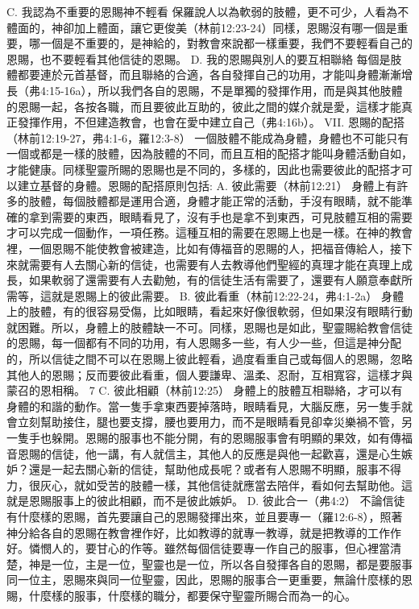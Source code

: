 C. 我認為不重要的恩賜神不輕看
保羅說人以為軟弱的肢體，更不可少，人看為不體面的，神卻加上體面，讓它更俊美（林前12:23-24）同樣，恩賜沒有哪一個是重要，哪一個是不重要的，是神給的，對教會來說都一樣重要，我們不要輕看自己的恩賜，也不要輕看其他信徒的恩賜。
D. 我的恩賜與別人的要互相聯絡
每個是肢體都要連於元首基督，而且聯絡的合適，各自發揮自己的功用，才能叫身體漸漸增長（弗4:15-16a），所以我們各自的恩賜，不是單獨的發揮作用，而是與其他肢體的恩賜一起，各按各職，而且要彼此互助的，彼此之間的媒介就是愛，這樣才能真正發揮作用，不但建造教會，也會在愛中建立自己（弗4:16b）。
VII. 恩賜的配搭（林前12:19-27，弗4:1-6，羅12:3-8）
一個肢體不能成為身體，身體也不可能只有一個或都是一樣的肢體，因為肢體的不同，而且互相的配搭才能叫身體活動自如，才能健康。同樣聖靈所賜的恩賜也是不同的，多樣的，因此也需要彼此的配搭才可以建立基督的身體。恩賜的配搭原則包括:
A. 彼此需要（林前12:21）
身體上有許多的肢體，每個肢體都是運用合適，身體才能正常的活動，手沒有眼睛，就不能準確的拿到需要的東西，眼睛看見了，沒有手也是拿不到東西，可見肢體互相的需要才可以完成一個動作，一項任務。這種互相的需要在恩賜上也是一樣。在神的教會裡，一個恩賜不能使教會被建造，比如有傳福音的恩賜的人，把福音傳給人，接下來就需要有人去關心新的信徒，也需要有人去教導他們聖經的真理才能在真理上成長，如果軟弱了還需要有人去勸勉，有的信徒生活有需要了，還要有人願意奉獻所需等，這就是恩賜上的彼此需要。
B. 彼此看重（林前12:22-24，弗4:1-2a）
身體上的肢體，有的很容易受傷，比如眼睛，看起來好像很軟弱，但如果沒有眼睛行動就困難。所以，身體上的肢體缺一不可。同樣，恩賜也是如此，聖靈賜給教會信徒的恩賜，每一個都有不同的功用，有人恩賜多一些，有人少一些，但這是神分配的，所以信徒之間不可以在恩賜上彼此輕看，過度看重自己或每個人的恩賜，忽略其他人的恩賜；反而要彼此看重，個人要謙卑、溫柔、忍耐，互相寬容，這樣才與蒙召的恩相稱。
7
C. 彼此相顧（林前12:25）
身體上的肢體互相聯絡，才可以有身體的和諧的動作。當一隻手拿東西要掉落時，眼睛看見，大腦反應，另一隻手就會立刻幫助接住，腿也要支撐，腰也要用力，而不是眼睛看見卻幸災樂禍不管，另一隻手也躲開。恩賜的服事也不能分開，有的恩賜服事會有明顯的果效，如有傳福音恩賜的信徒，他一講，有人就信主，其他人的反應是與他一起歡喜，還是心生嫉妒？還是一起去關心新的信徒，幫助他成長呢？或者有人恩賜不明顯，服事不得力，很灰心，就如受苦的肢體一樣，其他信徒就應當去陪伴，看如何去幫助他。這就是恩賜服事上的彼此相顧，而不是彼此嫉妒。
D. 彼此合一（弗4:2）
不論信徒有什麼樣的恩賜，首先要讓自己的恩賜發揮出來，並且要專一（羅12:6-8），照著神分給各自的恩賜在教會裡作好，比如教導的就專一教導，就是把教導的工作作好。憐憫人的，要甘心的作等。雖然每個信徒要專一作自己的服事，但心裡當清楚，神是一位，主是一位，聖靈也是一位，所以各自發揮各自的恩賜，都是要服事同一位主，恩賜來與同一位聖靈，因此，恩賜的服事合一更重要，無論什麼樣的恩賜，什麼樣的服事，什麼樣的職分，都要保守聖靈所賜合而為一的心。

